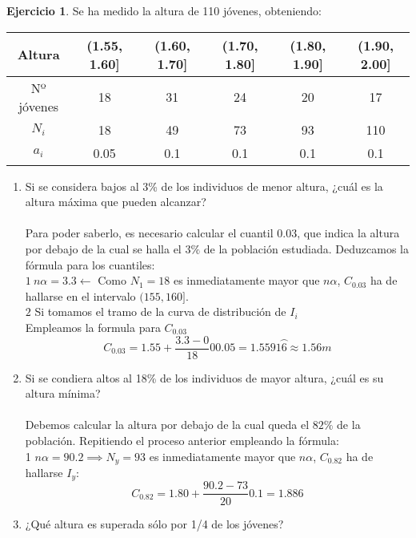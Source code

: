 \documentclass[a4paper, 12pt]{article}
\theoremstyle{definition}
\newtheorem{ej}{Ejercicio}
\begin{document}
\begin{ej}
Se ha medido la altura de 110 jóvenes, obteniendo:

\begin{center}
    \begin{tabular}{|c|c|c|c|c|c|}
    \hline
    Altura & (1.55, 1.60] & (1.60, 1.70] & (1.70, 1.80] & (1.80, 1.90] & (1.90, 2.00] \\
    \hline
    Nº jóvenes & 18 & 31 & 24 & 20 & 17 \\
    \hline
     $N_{i}$ & 18 & 49 & 73 & 93 & 110 \\
    \hline
    $a_{i}$ & 0.05 & 0.1 & 0.1 & 0.1 & 0.1 \\
    \hline
    \end{tabular}
\end{center}

\begin{enumerate}[label=\textit{\alph*)}]
    \item Si se considera bajos al 3\% de los individuos de menor altura, ¿cuál es la altura máxima que pueden alcanzar?
    \\\\
    Para poder saberlo, es necesario calcular el cuantil $0.03$, que indica la altura por debajo de la cual se halla el $3\%$ de la población estudiada. Deduzcamos la fórmula para los cuantiles:
  \\ 
  $1 \ n\alpha = 3.3 \leftarrow$ Como $N_{1} = 18$ es inmediatamente mayor que $n\alpha$, $C_{0.03}$ ha de hallarse en el intervalo $(155,160]$. \\
    $2$ Si tomamos el tramo de la curva de distribución de $I_{i}$ 
    \\
    Empleamos la formula para $C_{0.03}$ 
    $$C_{0.03} = 1.55 + \frac{3.3 - 0}{18}0 0.05 = 1.5591\wideparen{6} \approx 1.56 m$$
    \item Si se condiera altos al 18\% de los individuos de mayor altura, ¿cuál es su altura mínima? \\\\
    Debemos calcular la altura por debajo de la cual queda el $82\%$ de la población. Repitiendo el proceso anterior empleando la fórmula: 
    \\
    1 $n\alpha=90.2 \implies N_{y} = 93$ es inmediatamente mayor que $n\alpha$, $C_{0.82}$ ha de hallarse $I_{y}$:
    $$C_{0.82} = 1.80 + \frac{90.2 - 73}{20}0.1 = 1.886$$
    \item ¿Qué altura es superada sólo por 1/4 de los jóvenes? \\\\

\end{enumerate}
\end{ej}
\end{document}
